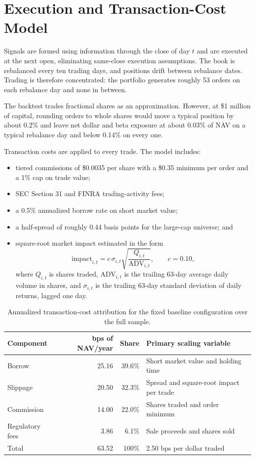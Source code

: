 \documentclass[11pt]{article}
\begin{document}
\section{Execution and Transaction-Cost Model}
\label{sec:execution}

Signals are formed using information through the close of day $t$ and are executed at the next open, eliminating same-close execution assumptions. The book is rebalanced every ten trading days, and positions drift between rebalance dates. Trading is therefore concentrated: the portfolio generates roughly 53 orders on each rebalance day and none in between.

The backtest trades fractional shares as an approximation. However, at \$1 million of capital, rounding orders to whole shares would move a typical position by about 0.2\% and leave net dollar and beta exposure at about 0.03\% of NAV on a typical rebalance day and below 0.14\% on every one.

Transaction costs are applied to every trade. The model includes:
\begin{itemize}
  \item tiered commissions of \$0.0035 per share with a \$0.35 minimum per order and a 1\% cap on trade value;
  \item SEC Section 31 and FINRA trading-activity fees;
  \item a 0.5\% annualized borrow rate on short market value;
  \item a half-spread of roughly 0.44 basis points for the large-cap universe; and
  \item square-root market impact estimated in the form
  \begin{equation}
    \mathrm{impact}_{i,t}=c\,\sigma_{i,t}\sqrt{\frac{Q_{i,t}}{\mathrm{ADV}_{i,t}}}, \qquad c=0.10,
  \end{equation}
  where $Q_{i,t}$ is shares traded, $\mathrm{ADV}_{i,t}$ is the trailing 63-day average daily volume in shares, and $\sigma_{i,t}$ is the trailing 63-day standard deviation of daily returns, lagged one day.
\end{itemize}

\begin{table}[t]
\centering
\caption{Annualized transaction-cost attribution for the fixed baseline configuration over the full sample.}
\label{tab:costs}
\begin{tabular}{lrrl}
\toprule
Component & bps of NAV/year & Share & Primary scaling variable \\
\midrule
Borrow & 25.16 & 39.6\% & Short market value and holding time \\
Slippage & 20.50 & 32.3\% & Spread and square-root impact per trade \\
Commission & 14.00 & 22.0\% & Shares traded and order minimum \\
Regulatory fees & 3.86 & 6.1\% & Sale proceeds and shares sold \\
\midrule
Total & 63.52 & 100\% & 2.50 bps per dollar traded \\
\bottomrule
\end{tabular}
\end{table}
\end{document}
